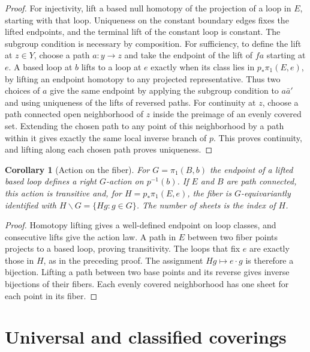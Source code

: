 \documentclass[11pt,oneside,openany]{book}
\theoremstyle{plain}
\newtheorem{corollary}[theorem]{Corollary}
\theoremstyle{definition}
\theoremstyle{remark}
\begin{document}
\begin{proof}
For injectivity, lift a based null homotopy of the projection
of a loop in \(E\), starting with that loop. Uniqueness on the
constant boundary edges fixes the lifted endpoints, and the
terminal lift of the constant loop is constant. The subgroup
condition is necessary by composition. For sufficiency, to
define the lift at \(z\in Y\), choose a path \(a:y\to z\) and
take the endpoint of the lift of \(fa\) starting at \(e\).
A based loop at \(b\) lifts to a loop at \(e\) exactly when
its class lies in \(p_*\pi_1(E,e)\), by lifting an endpoint
homotopy to any projected representative. Thus two choices
of \(a\) give the same endpoint by applying the subgroup
condition to \(a\bar a'\) and using uniqueness of the lifts
of reversed paths. For continuity at \(z\), choose a path
connected open neighborhood of \(z\) inside the preimage
of an evenly covered set. Extending the chosen path to any
point of this neighborhood by a path within it gives exactly
the same local inverse branch of \(p\). This proves
continuity, and lifting along each chosen path proves
uniqueness.
\end{proof}

\begin{corollary}[Action on the fiber]
\label{cor:p202-cover-action}
For \(G=\pi_1(B,b)\) the endpoint of a lifted based loop
defines a right \(G\)-action on \(p^{-1}(b)\). If \(E\) and
\(B\) are path connected, this action is transitive and,
for \(H=p_*\pi_1(E,e)\), the fiber is \(G\)-equivariantly
identified with \(H\backslash G=\{Hg:g\in G\}\).
The number of sheets is the index of \(H\).
\end{corollary}

\begin{proof}
Homotopy lifting gives a well-defined endpoint on loop
classes, and consecutive lifts give the action law. A path
in \(E\) between two fiber points projects to a based loop,
proving transitivity. The loops that fix \(e\) are exactly
those in \(H\), as in the preceding proof. The assignment
\(Hg\mapsto e\cdot g\) is therefore a bijection. Lifting
a path between two base points and its reverse gives
inverse bijections of their fibers. Each evenly covered
neighborhood has one sheet for each point in its fiber.
\end{proof}

\section{Universal and classified coverings}\label{p202:T07}
\end{document}
